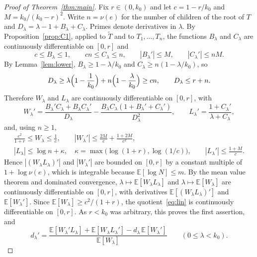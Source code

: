 \documentclass[11pt]{amsart}
\theoremstyle{definition}
\newcommand{\E}{\mathbb{E}}
\begin{document}
\begin{proof}[Proof of Theorem~\ref{thm:main}]
Fix $r\in(0,k_0)$ and let $c=1-r/k_0$ and $M=k_0/(k_0-r)^2$. Write $n=\nu(e)$ for the number of children of the
root of $T$ and $D_\lambda=\lambda-1+B_\lambda+C_\lambda$. Primes denote derivatives in $\lambda$. By
Proposition~\ref{prop:C1}, applied to $\tilde T$ and to $T_1,\dots,T_n$, the functions $B_\lambda$ and $C_\lambda$ are
continuously differentiable on $[0,r]$ and
\[
   c\le B_\lambda\le1,\qquad cn\le C_\lambda\le n,\qquad |B_\lambda'|\le M,\qquad |C_\lambda'|\le nM .
\]
By Lemma~\ref{lem:lower}, $B_\lambda\ge1-\lambda/k_0$ and $C_\lambda\ge n(1-\lambda/k_0)$, so
\[
   D_\lambda\ge\lambda\Bigl(1-\frac1{k_0}\Bigr)+n\Bigl(1-\frac{\lambda}{k_0}\Bigr)\ge cn,
   \qquad D_\lambda\le r+n .
\]
Therefore $W_\lambda$ and $L_\lambda$ are continuously differentiable on $[0,r]$, with
\[
   W_\lambda'=\frac{B_\lambda'C_\lambda+B_\lambda C_\lambda'}{D_\lambda}
     -\frac{B_\lambda C_\lambda(1+B_\lambda'+C_\lambda')}{D_\lambda^2},\qquad
   L_\lambda'=\frac{1+C_\lambda'}{\lambda+C_\lambda},
\]
and, using $n\ge1$,
\begin{gather*}
   \frac{c^2}{1+r}\le W_\lambda\le\frac1c,\qquad
   |W_\lambda'|\le\frac{2M}{c}+\frac{1+2M}{c^2},\\
   |L_\lambda|\le\log n+\kappa,\quad \kappa=\max\bigl(\log(1+r),\log(1/c)\bigr),\qquad
   |L_\lambda'|\le\frac{1+M}{c}.
\end{gather*}
Hence $|(W_\lambda L_\lambda)'|$ and $|W_\lambda'|$ are bounded on $[0,r]$ by a constant multiple of
$1+\log\nu(e)$, which is integrable because $\E[\log N]\le m$. By the mean value theorem and dominated
convergence, $\lambda\mapsto\E[W_\lambda L_\lambda]$ and $\lambda\mapsto\E[W_\lambda]$ are continuously
differentiable on $[0,r]$, with derivatives $\E[(W_\lambda L_\lambda)']$ and $\E[W_\lambda']$. Since
$\E[W_\lambda]\ge c^2/(1+r)$, the quotient~\eqref{eq:lin} is continuously differentiable on $[0,r]$. As
$r<k_0$ was arbitrary, this proves the first assertion, and
\begin{equation}\label{eq:quot}
   d_\lambda'=\frac{\E[W_\lambda'L_\lambda]+\E[W_\lambda L_\lambda']-d_\lambda\,\E[W_\lambda']}{\E[W_\lambda]}
   \qquad(0\le\lambda<k_0).
\end{equation}


\end{proof}
\end{document}
